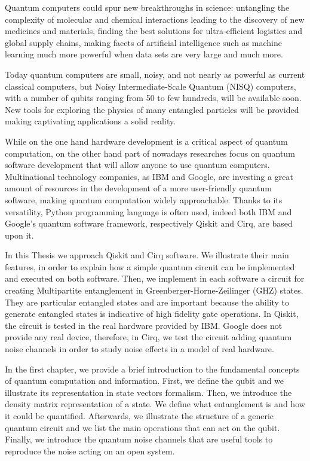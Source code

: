 \documentclass[11pt, a4paper, twoside, openright]{book}
\renewcommand{\'}[0]{\`}
\theoremstyle{definition}
\begin{document}
Quantum computers could spur new breakthroughs in science: untangling the complexity of molecular and chemical interactions leading to the discovery of new medicines and materials, finding the best solutions for ultra-efficient logistics and global supply chains, making facets of artificial intelligence such as machine learning much more powerful when data sets are very large and much more.

Today quantum computers are small, noisy, and not nearly as powerful as current classical computers, but Noisy Intermediate-Scale Quantum (NISQ) computers, with a number of qubits ranging from 50 to few hundreds, will be available soon. New tools for exploring the physics of many entangled particles will be provided making captivating applications a solid reality.

While on the one hand hardware development is a critical aspect of quantum computation, on the other hand part of nowadays researches focus on quantum software development that will allow anyone to use quantum computers. Multinational technology companies, as IBM and Google, are investing a great amount of resources in the development of a more user-friendly quantum software, making quantum computation widely approachable. 
Thanks to its versatility, Python programming language is often used, indeed both IBM and Google's quantum software framework, respectively Qiskit and Cirq, are based upon it.

In this Thesis we approach Qiskit and Cirq software. We illustrate their main features, in order to explain how a simple quantum circuit can be implemented and executed on both software. 
Then, we implement in each software a circuit for creating Multipartite entanglement in Greenberger-Horne-Zeilinger (GHZ) states. They are particular entangled states and are important because the ability to generate entangled states is indicative of high fidelity gate operations. In Qiskit, the circuit is tested in the real hardware provided by IBM. Google does not provide any real device, therefore, in Cirq, we test the circuit adding quantum noise channels in order to study noise effects in a model of real hardware.

In the first chapter, we provide a brief introduction to the fundamental concepts of quantum computation and information. First, we define the qubit and we illustrate its representation in state vectors formalism. Then, we introduce the density matrix representation of a state. We define what entanglement is and how it could be quantified. Afterwards, we illustrate the structure of a generic quantum circuit and we list the main operations that can act on the qubit.  Finally, we introduce the quantum noise channels that are useful tools to reproduce the noise acting on an open system.
\end{document}
